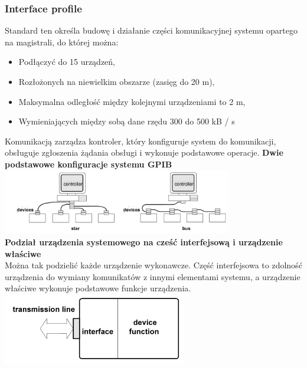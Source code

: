 \subsubsection{Interface profile}
Standard ten określa budowę i działanie części komunikacyjnej systemu opartego na magistrali, do której można:
\begin{itemize}
	\item Podłączyć do 15 urządzeń,
	\item Rozłożonych na niewielkim obszarze (zasięg do 20 m),
	\item Maksymalna odległość między kolejnymi urządzeniami to 2 m,
	\item Wymieniających między sobą dane rzędu 300 do 500 kB / s
\end{itemize}
Komunikacją zarządza kontroler, który konfiguruje system do komunikacji, obsługuje zgłoszenia żądania obsługi i wykonuje podstawowe operacje.
\textbf{Dwie podstawowe konfiguracje systemu GPIB}\\
\includegraphics[width=10cm]{./wyklady/IEEE488_SCPI_2_1.pdf}\\
\textbf{Podział urządzenia systemowego na cześć interfejsową i urządzenie właściwe}\\
Można tak podzielić każde urządzenie wykonawcze. Część interfejsowa to zdolność urządzenia do wymiany komunikatów z innymi elementami systemu, a urządzenie właściwe wykonuje podstawowe funkcje urządzenia.\\
\includegraphics[width=8cm]{./wyklady/IEEE488_SCPI_2_2.pdf}

\newpage
